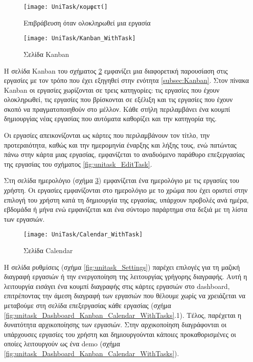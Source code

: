         \begin{figure}[h!] \noindent \centering
            \texttt{[image: UniTask/κομφετί]}
            \caption{\centering Επιβράβευση όταν ολοκληρωθεί μια εργασία}
            \label{fig:unitask_confetti}
        \end{figure}

        \begin{figure}[h!] \noindent \centering
            \texttt{[image: UniTask/Kanban\_WithTask]}
            \caption{\centering Σελίδα Kanban}
            \label{fig:unitask_Kanban_WithTask}
        \end{figure}

        Η σελίδα {\ZonaSB Kanban} του σχήματος \ref{fig:unitask_Kanban_WithTask} εμφανίζει μια διαφορετική παρουσίαση στις εργασίες με τον τρόπο που έχει εξηγηθεί στην ενότητα \ref{subsec:Kanban}. Στον πίνακα Kanban οι εργασίες χωρίζονται σε τρεις κατηγορίες: τις εργασίες που έχουν ολοκληρωθεί, τις εργασίες που βρίσκονται σε εξέλιξη και τις εργασίες που έχουν σκοπό να πραγματοποιηθούν στο μέλλον. Κάθε στήλη περιλαμβάνει ένα κουμπί δημιουργίας νέας εργασίας που αυτόματα καθορίζει και την κατηγορία της.

        Οι εργασίες απεικονίζονται ως κάρτες που περιλαμβάνουν τον τίτλο, την προτεραιότητα, καθώς και την ημερομηνία έναρξης και λήξης τους, ενώ πατώντας πάνω στην κάρτα μιας εργασίας, εμφανίζεται το αναδυόμενο παράθυρο επεξεργασίας της εργασίας του σχήματος \ref{fig:unitask_EditTask}.

        Στη σελίδα {\ZonaSB ημερολόγιο} (σχήμα \ref{fig:unitask_Calendar_WithTask}) εμφανίζεται ένα ημερολόγιο με τις εργασίες του χρήστη. Οι εργασίες εμφανίζονται στο ημερολόγιο με το χρώμα που έχει οριστεί στην επιλογή του χρήστη κατά τη δημιουργία της εργασίας, υπάρχουν προβολές ανά ημέρα, εβδομάδα ή μήνα ενώ εμφανίζεται και ένα σύντομο παράρτημα στα δεξιά με τη λίστα των εργασιών.

        \begin{figure}[h!] \noindent \centering
            \texttt{[image: UniTask/Calendar\_WithTask]}
            \caption{\centering Σελίδα Calendar}
            \label{fig:unitask_Calendar_WithTask}
        \end{figure}

        Η σελίδα {\ZonaSB ρυθμίσεις} (σχήμα \ref{fig:unitask_Settings}) παρέχει επιλογές για τη μαζική διαγραφή εργασιών ή την ενεργοποίηση της λειτουργίας γρήγορης διαγραφής. Αυτή η λειτουργία εισάγει ένα κουμπί διαγραφής στις κάρτες εργασιών στο dashboard, επιτρέποντας την άμεση διαγραφή των εργασιών που θέλουμε χωρίς να χρειάζεται να μεταβούμε στη σελίδα επεξεργασίας κάθε εργασίας (σχήμα \ref{fig:unitask_Dashboard_Kanban_Calendar_WithTasks}.1). Τέλος, παρέχεται η δυνατότητα αρχικοποίησης των εργασιών. Στην αρχικοποίηση διαγράφονται οι υπάρχουσες εργασίες του χρήστη και δημιουργούνται κάποιες προκαθορισμένες οι οποίες λειτουργούν ως ένα demo (σχήμα \ref{fig:unitask_Dashboard_Kanban_Calendar_WithTasks}).

